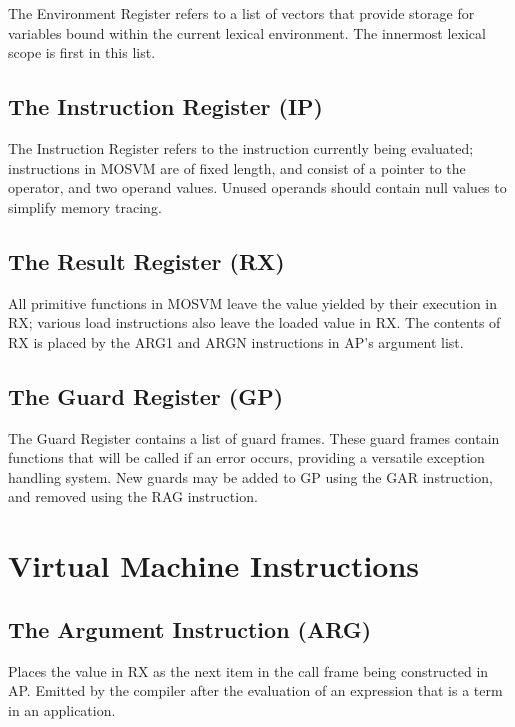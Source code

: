 \documentclass[notitlepage,oneside]{book}
\begin{document}
The Environment Register refers to a list of vectors that provide storage for variables bound within the current lexical environment.  The innermost lexical scope is first in this list.

\subsection{The Instruction Register (IP)}
\label{r-ip}

The Instruction Register refers to the instruction currently being evaluated; instructions in MOSVM are of fixed length, and consist of a pointer to the operator, and two operand values.  Unused operands should contain null values to
simplify memory tracing.

\subsection{The Result Register (RX)}
\label{r-rx}

All primitive functions in MOSVM leave the value yielded by their execution in RX; various load instructions also leave the loaded value in RX.  The contents of RX is placed by the ARG1 and ARGN instructions in AP's argument list.

\subsection{The Guard Register (GP)}
\label{r-gp}

The Guard Register contains a list of guard frames.  These guard frames contain functions that will be called if an error occurs, providing a versatile exception handling system.  New guards may be added to GP using the GAR instruction, and removed using the RAG instruction.

\section{Virtual Machine Instructions}

\subsection{The Argument Instruction (ARG)}
\label{i-arg}

Places the value in RX as the next item in the call frame being constructed in AP.  Emitted by the compiler after the evaluation of an expression that is a term in an application.
\end{document}
